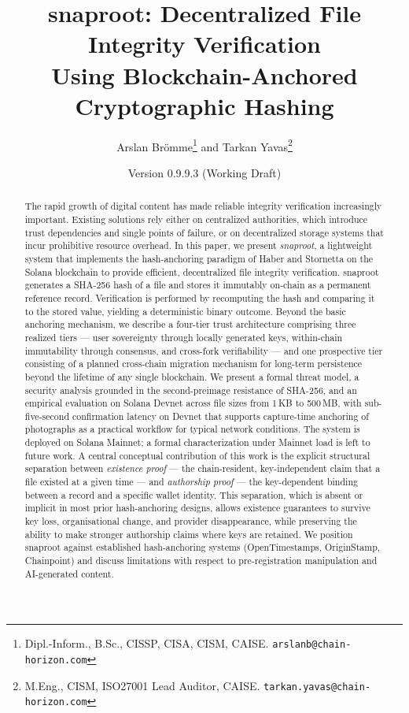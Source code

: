 \documentclass[11pt,a4paper]{article}
\title{snaproot: Decentralized File Integrity Verification \\
       Using Blockchain-Anchored Cryptographic Hashing}
\author[]{Arslan Br\"omme\thanks{Dipl.-Inform., B.Sc., CISSP, CISA, CISM, CAISE.
                            \texttt{arslanb@chain-horizon.com}}
{ }and Tarkan Yavas\thanks{M.Eng., CISM, ISO27001 Lead Auditor, CAISE.
                              \texttt{tarkan.yavas@chain-horizon.com}}}
\affil[]{Chain Horizon GmbH}
\date{Version 0.9.9.3 (Working Draft)}
\begin{document}
\maketitle

\begin{center}
\end{center}
\vspace{0.5em}

\begin{abstract}
The rapid growth of digital content has made reliable integrity verification
increasingly important. Existing solutions rely either on centralized
authorities, which introduce trust dependencies and single points of failure,
or on decentralized storage systems that incur prohibitive resource overhead.
In this paper, we present \emph{snaproot}, a lightweight system that
implements the hash-anchoring paradigm of Haber and Stornetta on the Solana
blockchain to provide efficient, decentralized file integrity verification.
snaproot generates a SHA-256 hash of a file and stores it immutably on-chain
as a permanent reference record. Verification is performed by recomputing
the hash and comparing it to the stored value, yielding a deterministic
binary outcome. Beyond the basic anchoring mechanism, we describe a
four-tier trust architecture comprising three realized tiers --- user
sovereignty through locally generated keys, within-chain immutability
through consensus, and cross-fork verifiability --- and one prospective
tier consisting of a planned cross-chain migration mechanism for
long-term persistence beyond the lifetime of any single blockchain. We present a formal threat
model, a security analysis grounded in the second-preimage resistance of
SHA-256, and an empirical evaluation on Solana Devnet across file sizes
from 1\,KB to 500\,MB, with sub-five-second confirmation latency on Devnet that
supports capture-time anchoring of photographs as a practical
workflow for typical network conditions. The system is deployed on Solana Mainnet;
a formal characterization under Mainnet load is left to future work.
A central conceptual contribution of this work is the explicit
structural separation between \emph{existence proof} --- the
chain-resident, key-independent claim that a file existed at a given
time --- and \emph{authorship proof} --- the key-dependent binding
between a record and a specific wallet identity. This separation,
which is absent or implicit in most prior hash-anchoring designs,
allows existence guarantees to survive key loss, organisational
change, and provider disappearance, while preserving the ability to
make stronger authorship claims where keys are retained. We position
snaproot against established hash-anchoring systems (OpenTimestamps,
OriginStamp, Chainpoint) and discuss limitations with respect to
pre-registration manipulation and AI-generated content.
\end{abstract}
\end{document}
